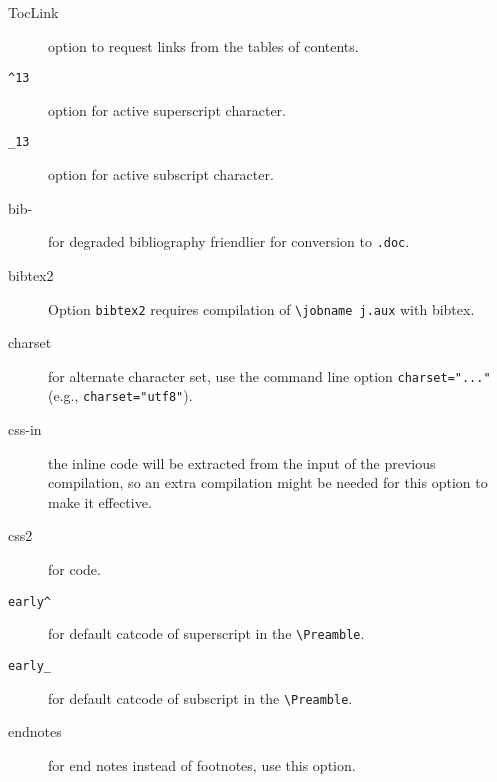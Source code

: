 \documentclass[a4paper]{article}
\begin{document}
\begin{description}

\item[TocLink] option to request links from the tables of contents.
  
\item[\tt ^13] option for active superscript character.

\item[\tt _13] option for active subscript character.



\item[bib-] for degraded bibliography friendlier for conversion to
  \verb=.doc=.

\item[bibtex2] Option \verb=bibtex2= requires compilation of
  \verb=\jobname j.aux= with bibtex.


\item[charset] for alternate character set, use the command line
  option \verb+charset="..."+ (e.g., \verb+charset="utf8"+).


\item[css-in] the inline \css code will be extracted from the input of
  the previous compilation, so an extra compilation might be needed for
  this option to make it effective.

\item[css2] for  code.


\item[\tt early^] for default catcode of superscript in the
  \verb=\Preamble=.

\item[\tt early_] for default catcode of subscript in the
  \verb=\Preamble=.


\item[endnotes] for end notes instead of footnotes, use this option.


\end{description}
\end{document}
